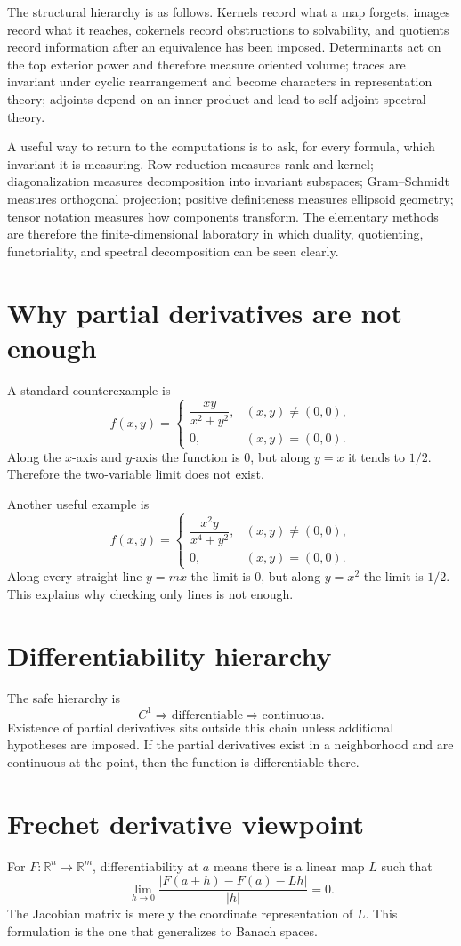 The structural hierarchy is as follows. Kernels record what a map forgets, images record what it reaches, cokernels record obstructions to solvability, and quotients record information after an equivalence has been imposed. Determinants act on the top exterior power and therefore measure oriented volume; traces are invariant under cyclic rearrangement and become characters in representation theory; adjoints depend on an inner product and lead to self-adjoint spectral theory.

A useful way to return to the computations is to ask, for every formula, which invariant it is measuring. Row reduction measures rank and kernel; diagonalization measures decomposition into invariant subspaces; Gram--Schmidt measures orthogonal projection; positive definiteness measures ellipsoid geometry; tensor notation measures how components transform. The elementary methods are therefore the finite-dimensional laboratory in which duality, quotienting, functoriality, and spectral decomposition can be seen clearly.


\section{Why partial derivatives are not enough}

A standard counterexample is
\[
  f(x,y)=
  \begin{cases}
  \dfrac{xy}{x^2+y^2},&(x,y)\ne(0,0),\\
  0,&(x,y)=(0,0).
  \end{cases}
\]
Along the $x$-axis and $y$-axis the function is $0$, but along $y=x$ it tends to $1/2$.  Therefore the two-variable limit does not exist.

Another useful example is
\[
  f(x,y)=
  \begin{cases}
  \dfrac{x^2y}{x^4+y^2},&(x,y)\ne(0,0),\\
  0,&(x,y)=(0,0).
  \end{cases}
\]
Along every straight line $y=mx$ the limit is $0$, but along $y=x^2$ the limit is $1/2$.  This explains why checking only lines is not enough.

\section{Differentiability hierarchy}

The safe hierarchy is
\[
  C^1\Longrightarrow\text{differentiable}\Longrightarrow\text{continuous}.
\]
Existence of partial derivatives sits outside this chain unless additional hypotheses are imposed.  If the partial derivatives exist in a neighborhood and are continuous at the point, then the function is differentiable there.

\section{Frechet derivative viewpoint}

For $F:\mathbb R^n\to\mathbb R^m$, differentiability at $a$ means there is a linear map $L$ such that
\[
  \lim_{h\to0}\frac{|F(a+h)-F(a)-Lh|}{|h|}=0.
\]
The Jacobian matrix is merely the coordinate representation of $L$.  This formulation is the one that generalizes to Banach spaces.
